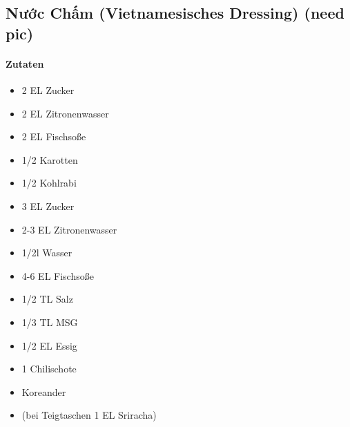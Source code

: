 \newpage
{}
\subsection{Nước Chấm (Vietnamesisches Dressing) (need pic)}
\paragraph{Zutaten}
\begin{itemize}[noitemsep]
	\item 2 EL Zucker
	\item 2 EL Zitronenwasser
	\item 2 EL Fischsoße
	\item 1/2 Karotten
	\item 1/2 Kohlrabi
	\item 3 EL Zucker
	\item 2-3 EL Zitronenwasser
	\item 1/2l Wasser
	\item 4-6 EL Fischsoße
	\item 1/2 TL Salz
	\item 1/3 TL MSG
	\item 1/2 EL Essig
	\item 1 Chilischote
	\item Koreander
	\item (bei Teigtaschen 1 EL Sriracha)
\end{itemize}
